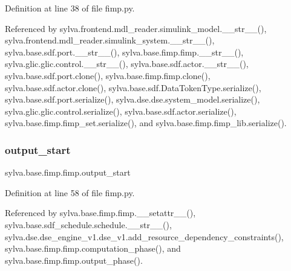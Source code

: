 Definition at line 38 of file fimp.\+py.



Referenced by sylva.\+frontend.\+mdl\+\_\+reader.\+simulink\+\_\+model.\+\_\+\+\_\+str\+\_\+\+\_\+(), sylva.\+frontend.\+mdl\+\_\+reader.\+simulink\+\_\+system.\+\_\+\+\_\+str\+\_\+\+\_\+(), sylva.\+base.\+sdf.\+port.\+\_\+\+\_\+str\+\_\+\+\_\+(), sylva.\+base.\+fimp.\+fimp.\+\_\+\+\_\+str\+\_\+\+\_\+(), sylva.\+glic.\+glic.\+control.\+\_\+\+\_\+str\+\_\+\+\_\+(), sylva.\+base.\+sdf.\+actor.\+\_\+\+\_\+str\+\_\+\+\_\+(), sylva.\+base.\+sdf.\+port.\+clone(), sylva.\+base.\+fimp.\+fimp.\+clone(), sylva.\+base.\+sdf.\+actor.\+clone(), sylva.\+base.\+sdf.\+Data\+Token\+Type.\+serialize(), sylva.\+base.\+sdf.\+port.\+serialize(), sylva.\+dse.\+dse.\+system\+\_\+model.\+serialize(), sylva.\+glic.\+glic.\+control.\+serialize(), sylva.\+base.\+sdf.\+actor.\+serialize(), sylva.\+base.\+fimp.\+fimp\+\_\+set.\+serialize(), and sylva.\+base.\+fimp.\+fimp\+\_\+lib.\+serialize().

\mbox{\label{classsylva_1_1base_1_1fimp_1_1fimp_a2782f46c3a7713c9c9d7ff5be05615a8}} 
\subsubsection{\texorpdfstring{output\+\_\+start}{output\_start}}
{\footnotesize\ttfamily sylva.\+base.\+fimp.\+fimp.\+output\+\_\+start}



Definition at line 58 of file fimp.\+py.



Referenced by sylva.\+base.\+fimp.\+fimp.\+\_\+\+\_\+setattr\+\_\+\+\_\+(), sylva.\+base.\+sdf\+\_\+schedule.\+schedule.\+\_\+\+\_\+str\+\_\+\+\_\+(), sylva.\+dse.\+dse\+\_\+engine\+\_\+v1.\+dse\+\_\+v1.\+add\+\_\+resource\+\_\+dependency\+\_\+constraints(), sylva.\+base.\+fimp.\+fimp.\+computation\+\_\+phase(), and sylva.\+base.\+fimp.\+fimp.\+output\+\_\+phase().

\mbox{\label{classsylva_1_1base_1_1fimp_1_1fimp_a2a0ef56805a0a4b151421c183d7b78ca}} 
